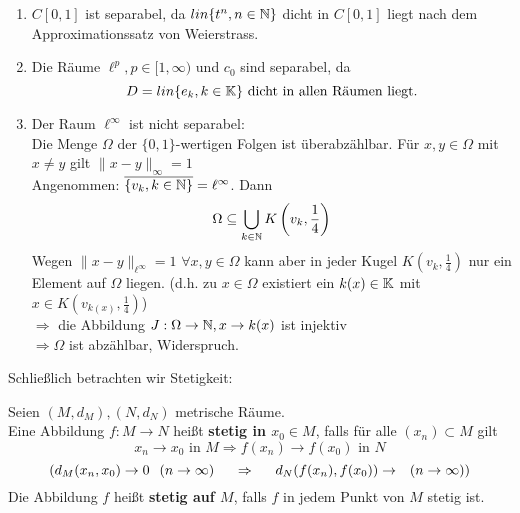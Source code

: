 \begin{beispiel}
\begin{enumerate}[label=\alph*\upshape)]
			\begin{beweis}
				Wir definieren %
				\[ lin_{\MdQ} Y = \{ y = \sum_{i = 1}^{n} q_{j} y_{j} : q_{j} \in \MdQ \quad (q_{j} \in \MdQ + i \MdQ ), y_{j} \in Y, n \in \MdN \} \]
				Dann ist $lin Y$ abzählbar, da $Y$ abzählbar ist. Sei nun $\epsilon > 0$ beliebig, $x \in X$. \\
				Nach Voraussetzung existiert dann ein $y \in lin Y$ mit $\| x - y \| < \epsilon$ \\
				Zu diesem $y$ finden wir ein $z \in lin_{\MdQ} Y$ mit $\| y - z \| < \epsilon$
				\[ \Rightarrow \| x - z \| < 2 \epsilon, \quad \text{d.h. } lin_{\MdQ} Y = X \]
			\end{beweis}
		\item $C[0, 1]$ ist separabel, da $ lin \{ t^{n}, n \in \mathbb{N} \} $ dicht in $C[0, 1]$ liegt nach dem Approximationssatz von Weierstrass.
		\item Die Räume $\ell^{p}, p \in [1, \infty)$ und $c_{0}$ sind separabel, da
			\[ D = lin \{ e_{k}, k \in \mathbb{K} \} \text{ dicht in allen Räumen liegt.} \]
		\item Der Raum $\ell^{\infty}$ ist nicht separabel: \\
			Die Menge $\Omega$ der $\{0, 1\}$-wertigen Folgen ist überabzählbar. Für $x, y \in \Omega$ mit $x \neq y$ gilt $\| x - y \|_{\infty} = 1$ \\
			Angenommen: $\overline{ \{v_{k}, k \in \mathbb{N} \} } = \ell^{\infty}$. Dann
			\[ \Omega \subseteq \bigcup_{k \in \mathbb{N}} K \left( v_{k}, \frac{1}{4} \right) \]
			Wegen $\| x - y\|_{\ell^{\infty}} = 1$ $\forall x, y \in \Omega$ kann aber in jeder Kugel $K(v_{k}, \frac{1}{4})$ nur ein Element auf $\Omega$ liegen. 
			(d.h. zu $x \in \Omega$ existiert ein $k(x) \in \mathbb{K}$ mit $x \in K(v_{k(x)}, \frac{1}{4})$) \\
			$\Rightarrow$ die Abbildung $ J : \Omega \rightarrow \mathbb{N}, x \rightarrow k(x)$ ist injektiv \\
			$\Rightarrow \Omega$ ist abzählbar, Widerspruch.
	\end{enumerate}
\end{beispiel}

Schlie{\ss}lich betrachten wir Stetigkeit:

\begin{definition} 
	Seien $(M, d_{M}), (N, d_{N})$ metrische Räume. \\
	Eine Abbildung $f: M \rightarrow N$ hei{\ss}t \textbf{stetig in $x_{0} \in M$}, falls für alle $(x_{n}) \subset M$ gilt
	\[ x_{n} \rightarrow x_{0} \text{ in } M \Rightarrow f(x_{n}) \rightarrow f(x_{0}) \text{ in } N \]
	\[ (d_{M}(x_{n}, x_{0}) \rightarrow 0 \hspace{0.25cm} (n \rightarrow \infty) \hspace{0.5cm} \Rightarrow \hspace{0.5cm} d_{N}(f(x_{n}), f(x_{0})) \rightarrow \hspace{0.25cm} (n \rightarrow \infty)) \]
	Die Abbildung $f$ hei{\ss}t \textbf{stetig auf $M$}, falls $f$ in jedem Punkt von $M$ stetig ist.
\end{definition}

